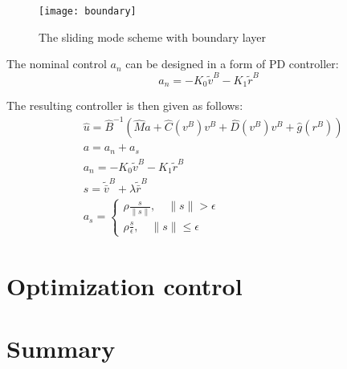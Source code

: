     \begin{figure}[H]
        \centering\texttt{[image: boundary]}
        \caption{The sliding mode scheme with boundary layer}
        \label{image:boundary}
    \end{figure}

    The nominal control $a_n$ can be 
    designed in a form of PD controller:
    $$
        a_n = - K_0\tilde{v}^B - K_1\tilde{r}^B
    $$

    The resulting controller is then given as follows:
    \begin{align*} 
        &\hat u = \hat{B}^{-1}(\hat{M}a + \hat{C}(v^B)v^B + \hat{D}(v^B)v^B + \hat{g}(r^B)) \\
        &a = a_n + a_s \\
        &a_n = - K_0\tilde{v}^B - K_1\tilde{r}^B \\
        &s = \tilde{\bar{v}}^B + \lambda \tilde{\bar{r}}^B \\
        &a_s = 
        \begin{cases}
        \rho \frac{s}{\|s\|}, \quad \|s\| >\epsilon\\
        \rho \frac{s}{\epsilon}, \quad \|s\| \leq\epsilon
        \end{cases}
    \end{align*}

\section{Optimization control}



\section{Summary}



